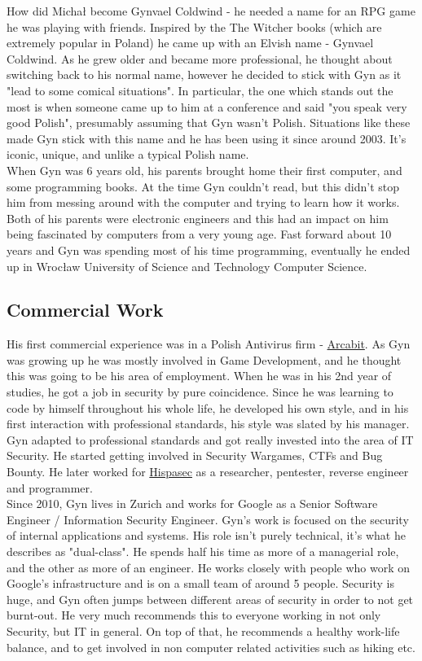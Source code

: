 \documentclass[11pt]{article}
\begin{document}
How did Michał become Gynvael Coldwind - he needed a name for an RPG game he was playing with friends. Inspired by the The Witcher books (which are extremely popular in Poland) he came up with an Elvish name - Gynvael Coldwind. As he grew older and became more professional, he thought about switching back to his normal name, however he decided to stick with Gyn as it "lead to some comical situations". In particular, the one which stands out the most is when someone came up to him at a conference and said "you speak very good Polish", presumably assuming that Gyn wasn't Polish. Situations like these made Gyn stick with this name and he has been using it since around 2003. It's iconic, unique, and unlike a typical Polish name. \\

When Gyn was 6 years old, his parents brought home their first computer, and some programming books. At the time Gyn couldn't read, but this didn't stop him from messing around with the computer and trying to learn how it works. Both of his parents were electronic engineers and this had an impact on him being fascinated by computers from a very young age. Fast forward about 10 years and Gyn was spending most of his time programming, eventually he ended up in Wrocław University of Science and Technology Computer Science.

\subsection{Commercial Work}
His first commercial experience was in a Polish Antivirus firm - \href{https://www.arcabit.pl/}{Arcabit}. As Gyn was growing up he was mostly involved in Game Development, and he thought this was going to be his area of employment. When he was in his 2nd year of studies, he got a job in security by pure coincidence. Since he was learning to code by himself throughout his whole life, he developed his own style, and in his first interaction with professional standards, his style was slated by his manager. Gyn adapted to professional standards and got really invested into the area of IT Security. He started getting involved in Security Wargames, CTFs and Bug Bounty. He later worked for \href{https://hispasec.com/en/}{Hispasec} as a researcher, pentester, reverse engineer and programmer. \\

Since 2010, Gyn lives in Zurich and works for Google as a Senior Software Engineer / Information Security Engineer. Gyn's work is focused on the security of internal applications and systems. His role isn't purely technical, it's what he describes as "dual-class". He spends half his time as more of a managerial role, and the other as more of an engineer. He works closely with people who work on Google's infrastructure and is on a small team of around 5 people. Security is huge, and Gyn often jumps between different areas of security in order to not get burnt-out. He very much recommends this to everyone working in not only Security, but IT in general. On top of that, he recommends a healthy work-life balance, and to get involved in non computer related activities such as hiking etc.
\end{document}
